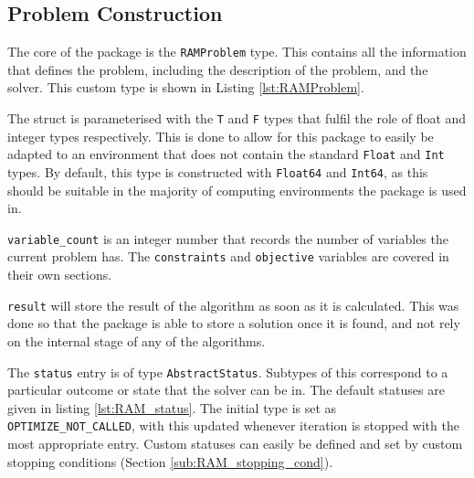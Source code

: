 \subsection{Problem Construction}

The core of the package is the \texttt{RAMProblem} type. This contains all the information that defines the problem, including the description of the problem, and the solver. This custom type is shown in Listing \ref{lst:RAMProblem}. 

The struct is parameterised with the \texttt{T} and \texttt{F} types that fulfil the role of float and integer types respectively. This is done to allow for this package to easily be adapted to an environment that does not contain the standard \texttt{Float} and \texttt{Int} types. By default, this type is constructed with \texttt{Float64} and \texttt{Int64}, as this should be suitable in the majority of computing environments the package is used in.




\texttt{variable\_count} is an integer number that records the number of variables the current problem has. The \texttt{constraints} and \texttt{objective} variables are covered in their own sections. 

\texttt{result} will store the result of the algorithm as soon as it is calculated. This was done so that the package is able to store a solution once it is found, and not rely on the internal stage of any of the algorithms.

The \texttt{status} entry is of type \texttt{AbstractStatus}. Subtypes of this correspond to a particular outcome or state that the solver can be in. The default statuses are given in listing \ref{lst:RAM_status}. The initial type is set as \texttt{OPTIMIZE\_NOT\_CALLED}, with this updated whenever iteration is stopped with the most appropriate entry. Custom statuses can easily be defined and set by custom stopping conditions (Section \ref{sub:RAM_stopping_cond}).

